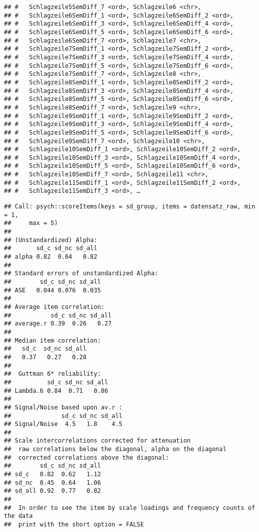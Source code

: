\documentclass[]{article}
\begin{document}
\begin{verbatim}
## #   Schlagzeile5SemDiff_7 <ord>, Schlagzeile6 <chr>,
## #   Schlagzeile6SemDiff_1 <ord>, Schlagzeile6SemDiff_2 <ord>,
## #   Schlagzeile6SemDiff_3 <ord>, Schlagzeile6SemDiff_4 <ord>,
## #   Schlagzeile6SemDiff_5 <ord>, Schlagzeile6SemDiff_6 <ord>,
## #   Schlagzeile6SemDiff_7 <ord>, Schlagzeile7 <chr>,
## #   Schlagzeile7SemDiff_1 <ord>, Schlagzeile7SemDiff_2 <ord>,
## #   Schlagzeile7SemDiff_3 <ord>, Schlagzeile7SemDiff_4 <ord>,
## #   Schlagzeile7SemDiff_5 <ord>, Schlagzeile7SemDiff_6 <ord>,
## #   Schlagzeile7SemDiff_7 <ord>, Schlagzeile8 <chr>,
## #   Schlagzeile8SemDiff_1 <ord>, Schlagzeile8SemDiff_2 <ord>,
## #   Schlagzeile8SemDiff_3 <ord>, Schlagzeile8SemDiff_4 <ord>,
## #   Schlagzeile8SemDiff_5 <ord>, Schlagzeile8SemDiff_6 <ord>,
## #   Schlagzeile8SemDiff_7 <ord>, Schlagzeile9 <chr>,
## #   Schlagzeile9SemDiff_1 <ord>, Schlagzeile9SemDiff_2 <ord>,
## #   Schlagzeile9SemDiff_3 <ord>, Schlagzeile9SemDiff_4 <ord>,
## #   Schlagzeile9SemDiff_5 <ord>, Schlagzeile9SemDiff_6 <ord>,
## #   Schlagzeile9SemDiff_7 <ord>, Schlagzeile10 <chr>,
## #   Schlagzeile10SemDiff_1 <ord>, Schlagzeile10SemDiff_2 <ord>,
## #   Schlagzeile10SemDiff_3 <ord>, Schlagzeile10SemDiff_4 <ord>,
## #   Schlagzeile10SemDiff_5 <ord>, Schlagzeile10SemDiff_6 <ord>,
## #   Schlagzeile10SemDiff_7 <ord>, Schlagzeile11 <chr>,
## #   Schlagzeile11SemDiff_1 <ord>, Schlagzeile11SemDiff_2 <ord>,
## #   Schlagzeile11SemDiff_3 <ord>, …
\end{verbatim}

\begin{verbatim}
## Call: psych::scoreItems(keys = sd_group, items = datensatz_raw, min = 1, 
##     max = 5)
## 
## (Unstandardized) Alpha:
##       sd_c sd_nc sd_all
## alpha 0.82  0.64   0.82
## 
## Standard errors of unstandardized Alpha:
##        sd_c sd_nc sd_all
## ASE   0.044 0.076  0.035
## 
## Average item correlation:
##           sd_c sd_nc sd_all
## average.r 0.39  0.26   0.27
## 
## Median item correlation:
##   sd_c  sd_nc sd_all 
##   0.37   0.27   0.28 
## 
##  Guttman 6* reliability: 
##          sd_c sd_nc sd_all
## Lambda.6 0.84  0.71   0.86
## 
## Signal/Noise based upon av.r : 
##              sd_c sd_nc sd_all
## Signal/Noise  4.5   1.8    4.5
## 
## Scale intercorrelations corrected for attenuation 
##  raw correlations below the diagonal, alpha on the diagonal 
##  corrected correlations above the diagonal:
##        sd_c sd_nc sd_all
## sd_c   0.82  0.62   1.12
## sd_nc  0.45  0.64   1.06
## sd_all 0.92  0.77   0.82
## 
##  In order to see the item by scale loadings and frequency counts of the data
##  print with the short option = FALSE
\end{verbatim}
\end{document}
